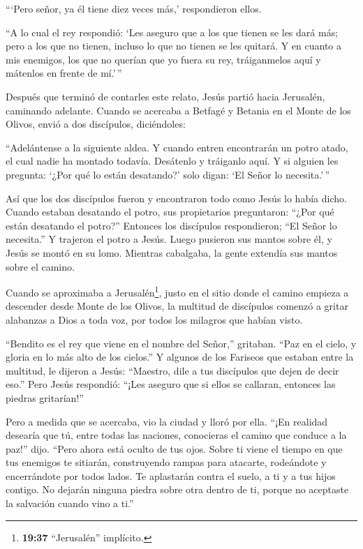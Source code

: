  ```Pero señor, ya él tiene diez veces más,' respondieron
ellos.

 ``A lo cual el rey respondió: `Les aseguro que a los que
tienen se les dará más; pero a los que no tienen, incluso lo que no
tienen se les quitará.  Y en cuanto a mis enemigos, los que
no querían que yo fuera su rey, tráiganmelos aquí y mátenlos en frente
de mí.'\,''

 Después que terminó de contarles este relato, Jesús partió
hacia Jerusalén, caminando adelante.  Cuando se acercaba a
Betfagé y Betania en el Monte de los Olivos, envió a dos discípulos,
diciéndoles:

 ``Adelántense a la siguiente aldea. Y cuando entren
encontrarán un potro atado, el cual nadie ha montado todavía. Desátenlo
y tráiganlo aquí.  Y si alguien les pregunta: `¿Por qué lo
están desatando?' solo digan: `El Señor lo necesita.'\,''

 Así que los dos discípulos fueron y encontraron todo como
Jesús lo había dicho.  Cuando estaban desatando el potro,
sus propietarios preguntaron: ``¿Por qué están desatando el potro?''
 Entonces los discípulos respondieron; ``El Señor lo
necesita.''  Y trajeron el potro a Jesús. Luego pusieron
sus mantos sobre él, y Jesús se montó en su lomo.  Mientras
cabalgaba, la gente extendía sus mantos sobre el camino.

 Cuando se aproximaba a Jerusalén\footnote{\textbf{19:37}
  ``Jerusalén'' implícito.}, justo en el sitio donde el camino empieza a
descender desde Monte de los Olivos, la multitud de discípulos comenzó a
gritar alabanzas a Dios a toda voz, por todos los milagros que habían
visto.

 ``Bendito es el rey que viene en el nombre del Señor,''
gritaban. ``Paz en el cielo, y gloria en lo más alto de los cielos.''
 Y algunos de los Fariseos que estaban entre la multitud,
le dijeron a Jesús: ``Maestro, dile a tus discípulos que dejen de decir
eso.''  Pero Jesús respondió: ``¡Les aseguro que si ellos
se callaran, entonces las piedras gritarían!''

 Pero a medida que se acercaba, vio la ciudad y lloró por
ella.  ``¡En realidad desearía que tú, entre todas las
naciones, conocieras el camino que conduce a la paz!'' dijo. ``Pero
ahora está oculto de tus ojos.  Sobre ti viene el tiempo en
que tus enemigos te sitiarán, construyendo rampas para atacarte,
rodeándote y encerrándote por todos lados.  Te aplastarán
contra el suelo, a ti y a tus hijos contigo. No dejarán ninguna piedra
sobre otra dentro de ti, porque no aceptaste la salvación cuando vino a
ti.''

